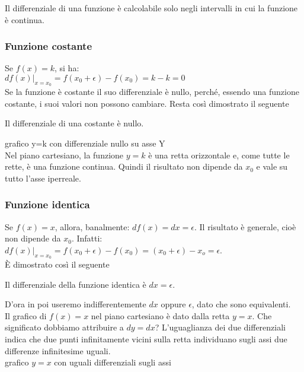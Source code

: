 \begin{osservazione}
 Il differenziale di una funzione è calcolabile solo negli intervalli in cui
 la funzione è continua.
\end{osservazione}

\subsubsection{Funzione costante}
\label{subsec:diff01_diffcostante}
Se $f(x)=k$, si ha:\\
$df(x)|_{x=x_0}=f(x_0+\epsilon)-f(x_0)=k-k=0$\\
Se la funzione è costante il suo differenziale è nullo,
perché, essendo una funzione costante, i suoi valori non possono cambiare. 
Resta così dimostrato il seguente

\begin{teorema}
Il differenziale di una costante è nullo.
\end{teorema}

grafico y=k con differenziale nullo su asse Y\\

Nel piano cartesiano, la funzione  $y=k$ è una retta orizzontale e, come tutte
le rette, è una funzione continua. Quindi il risultato non dipende da $x_0$ e
vale su tutto l'asse iperreale.

\subsubsection{Funzione identica}
\label{diffidentica}
Se $f(x)=x$, allora, banalmente: $df(x)=dx=\epsilon$. Il risultato è
generale, cioè non dipende da $x_0$. Infatti:\\
$df(x)|_{x=x_0}=f(x_0+\epsilon)-f(x_0)=(x_0+\epsilon)-x_o=\epsilon$.\\
È dimostrato così il seguente
\begin{teorema}
Il differenziale della funzione identica è $dx=\epsilon$.
\end{teorema}
D'ora in poi useremo indifferentemente $dx$ oppure $\epsilon$, dato che
sono equivalenti.\\
Il grafico di $f(x)=x$ nel piano cartesiano è dato dalla retta $y=x$. 
Che significato dobbiamo attribuire a $dy=dx$?
L'uguaglianza dei due differenziali indica che due punti infinitamente
vicini sulla retta individuano sugli assi due differenze infinitesime 
uguali.\\

grafico \(y=x\) con uguali differenziali sugli assi\\  %

